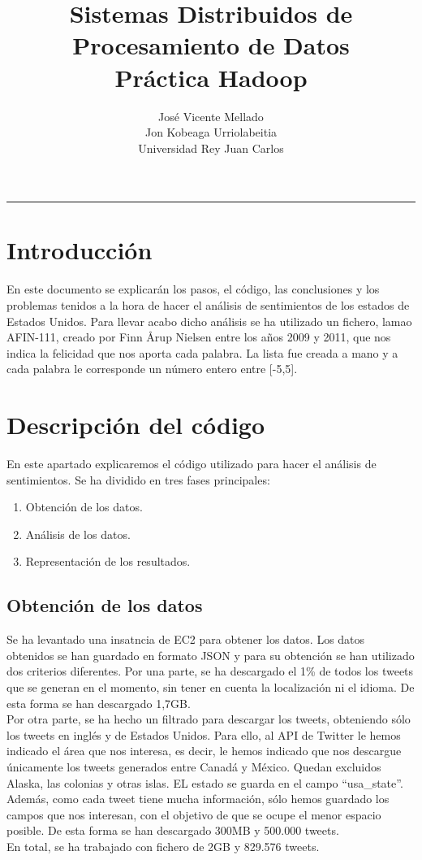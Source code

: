 \documentclass[12pt,a4paper]{article}
\title{Sistemas Distribuidos de Procesamiento de Datos\\Práctica Hadoop}
\author{José Vicente Mellado \\ Jon Kobeaga Urriolabeitia\\Universidad Rey Juan Carlos}
\begin{document}
\maketitle
\hrule
\tableofcontents

\section{Introducción}
En este documento se explicarán los pasos, el código, las conclusiones y los problemas tenidos a la hora de hacer el análisis de sentimientos de los estados de Estados Unidos. Para llevar acabo dicho análisis se ha utilizado un fichero, lamao AFIN-111, creado por Finn Årup Nielsen entre los años 2009 y 2011, que nos indica la felicidad que nos aporta cada palabra. La lista fue creada a mano y a cada palabra le corresponde un número entero entre [-5,5].


\section{Descripción del código}

En este apartado explicaremos el código utilizado para hacer el análisis de sentimientos. Se ha dividido en tres fases principales:

\begin{enumerate}
\item Obtención de los datos.
\item Análisis de los datos.
\item Representación de los resultados.
\end{enumerate}

\subsection{Obtención de los datos}
Se ha levantado una insatncia de EC2 para obtener los datos. Los datos obtenidos se han guardado en formato JSON y para su obtención se han utilizado dos criterios diferentes. Por una parte, se ha descargado el 1\% de todos los tweets que se generan en el momento, sin tener en cuenta la localización ni el idioma. De esta forma se han descargado 1,7GB.\\
Por otra parte, se ha hecho un filtrado para descargar los tweets, obteniendo sólo los tweets en inglés y de Estados Unidos. Para ello, al API de Twitter le hemos indicado el área que nos interesa, es decir, le hemos indicado que nos descargue únicamente los tweets generados entre Canadá y México. Quedan excluidos Alaska, las colonias y otras islas. EL estado se guarda en el campo ``usa\_state''. Además, como cada tweet tiene mucha información, sólo hemos guardado los campos que nos interesan, con el objetivo de que se ocupe el menor espacio posible. De esta forma se han descargado 300MB y 500.000 tweets.\\
En total, se ha trabajado con fichero de 2GB y 829.576 tweets.
\end{document}
